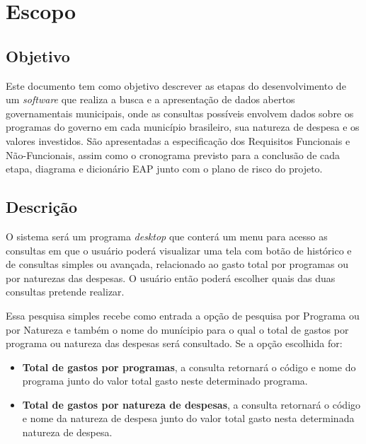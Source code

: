 \documentclass[a4paper,12pt]{article}
\begin{document}


\tableofcontents %

\thispagestyle{empty} %

\newpage
\section{Escopo}
\subsection{Objetivo}

Este documento tem como objetivo descrever as etapas do desenvolvimento de um \textit{software} que realiza a busca e a apresentação de dados abertos governamentais municipais, onde as consultas possíveis envolvem dados sobre os programas do governo em cada município brasileiro, sua natureza de despesa e os valores investidos.
São apresentadas a especificação dos Requisitos Funcionais e Não-Funcionais, assim como o cronograma previsto para a conclusão de cada etapa, diagrama e dicionário EAP junto com o plano de risco do projeto.

\subsection{Descrição}

O sistema será um programa \textit{desktop} que conterá um menu para acesso as consultas em que o usuário poderá visualizar uma tela com botão de histórico e de consultas simples ou avançada, relacionado ao gasto total por programas ou por naturezas das despesas. O usuário então poderá escolher quais das duas consultas pretende realizar.

Essa pesquisa simples recebe como entrada a opção de pesquisa por Programa ou por Natureza e também o nome do munícipio para o qual o total de gastos por programa ou natureza das despesas será consultado. Se a opção escolhida for:

\begin{itemize}
\item \textbf{Total de gastos por programas}, a consulta retornará o código e nome do programa junto do valor total gasto neste determinado programa. 

\item \textbf{Total de gastos por natureza de despesas}, a consulta retornará o código e nome da natureza de despesa junto do valor total gasto nesta determinada natureza de despesa.

\end{itemize}
\end{document}
